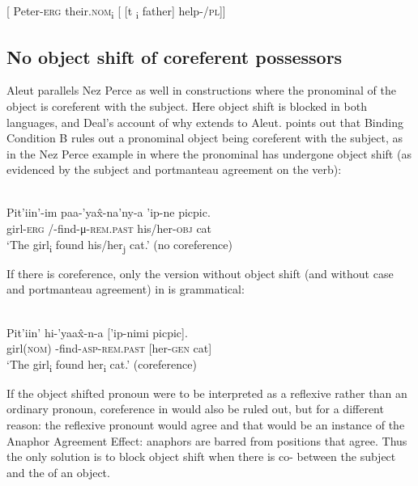 \documentclass[output=paper]{LSP/langsci}
\begin{document}
\ea\label{ex:woolford:39}{}
[ Peter-\textsc{erg}  their.\textsc{nom}\textsubscript{i} [ [t\textsubscript{ i}  father]  help-/\textsc{pl}]]
\z

\subsection{No object shift of coreferent possessors}
Aleut parallels Nez Perce as well in constructions where the pronominal  of the object is coreferent with the subject. Here object shift is blocked in both languages, and Deal’s account of why extends to Aleut. \citet[413]{Deal2013} points out that Binding Condition B rules out a pronominal object being coreferent with the subject, as in the Nez Perce example in  where the pronominal  has undergone object shift (as evidenced by the  subject and portmanteau agreement on the verb):

\ea\label{ex:woolford:40}
\\
\gll Pit’iin’-im   paa-’ya\^{x}-na’ny-a  ’ip-ne picpic. \\
     girl-\textsc{erg}    /-find-μ-\textsc{rem.past}    his/her-\textsc{obj}  cat               \\
\glt ‘The girl\textsubscript{i} found his/her\textsubscript{j} cat.’    (no coreference)  
\z

If there is coreference, only the version without object shift (and without  case and portmanteau agreement) in  is grammatical:

\ea\label{ex:woolford:41}
\\
\gll Pit’iin’    hi-’yaa\^{x}-n-a     [’ip-nimi  picpic].\\
     girl(\textsc{nom})  -find-\textsc{asp}-\textsc{rem.past}  [her-\textsc{gen}  cat]      \\
\glt ‘The girl\textsubscript{i} found her\textsubscript{i} cat.’    (coreference)  
\z

If the object shifted pronoun were to be interpreted as a reflexive rather than an ordinary pronoun, coreference in  would also be ruled out, but for a different reason: the reflexive pronount would agree and that would be an instance of the Anaphor Agreement Effect: anaphors are barred from positions that agree. Thus the only solution is to block object shift when there is co- between the subject and the  of an object.
\end{document}
